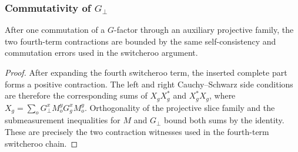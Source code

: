 \subsubsection{Commutativity of $G_{\bot}$}

\begin{lemma}\label{lem:switcheroo-contraction-estimates}
	\leanok
	After one commutation of a $G$-factor through an auxiliary projective
	family, the two fourth-term contractions are bounded by the same
	self-consistency and commutation errors used in the switcheroo argument.
\end{lemma}
\begin{proof}
	\leanok
	After expanding the fourth switcheroo term, the inserted complete part
	forms a positive contraction.  The left and right Cauchy--Schwarz
	side conditions are therefore the corresponding sums of
	$X_gX_g^\ast$ and $X_g^\ast X_g$, where
	$X_g=\sum_o G_{\bot}^x M_o^yG_g^xM_o^y$.  Orthogonality of the
	projective slice family and the submeasurement inequalities for $M$
	and $G_{\bot}$ bound both sums by the identity.  These are precisely
	the two contraction witnesses used in the fourth-term switcheroo chain.
\end{proof}

